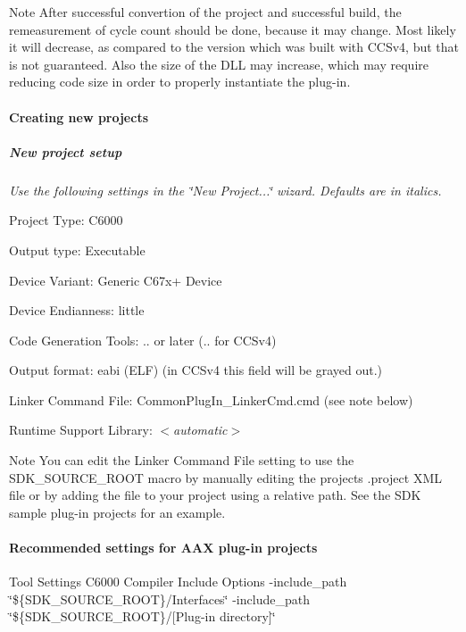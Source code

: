 \begin{DoxyNote}{Note}
After successful convertion of the project and successful build, the remeasurement of cycle count should be done, because it may change. Most likely it will decrease, as compared to the version which was built with C\+C\+Sv4, but that is not guaranteed. Also the size of the D\+LL may increase, which may require reducing code size in order to properly instantiate the plug-\/in.
\end{DoxyNote}
\hypertarget{a00832_subsubsection__creating_new_projects_}{}\paragraph{Creating new projects}\label{a00832_subsubsection__creating_new_projects_}
\subparagraph*{New project setup}

 {\itshape  Use the following settings in the \char`\"{}\+New Project...\char`\"{} wizard. Defaults are in italics.} 
\begin{DoxyItemize}
\item Project Type\+: {\ttfamily C6000}  
\item Output type\+: {\ttfamily Executable}  
\item Device Variant\+: {\ttfamily Generic C67x+ Device}  
\item Device Endianness\+: {\ttfamily little}  
\item Code Generation Tools\+: {..} or later ({..} for C\+C\+Sv4)  
\item Output format\+: eabi (E\+LF) (in C\+C\+Sv4 this field will be grayed out.) 
\item Linker Command File\+: {\ttfamily Common\+Plug\+In\+\_\+\+Linker\+Cmd.\+cmd} (see note below)  
\item Runtime Support Library\+: {\itshape  $<$automatic$>$}  
\end{DoxyItemize}

\begin{DoxyNote}{Note}
You can edit the Linker Command File setting to use the {\ttfamily S\+D\+K\+\_\+\+S\+O\+U\+R\+C\+E\+\_\+\+R\+O\+OT} macro by manually editing the project\textquotesingle{}s .project X\+ML file or by adding the file to your project using a relative path. See the S\+DK sample plug-\/in projects for an example.
\end{DoxyNote}
\hypertarget{a00832_subsubsection__recommended_settings_for_aax_plugin_projects_}{}\paragraph{Recommended settings for A\+A\+X plug-\/in projects}\label{a00832_subsubsection__recommended_settings_for_aax_plugin_projects_}
  Tool Settings   C6000 Compiler   Include Options   -\/{\ttfamily include\+\_\+path \char`\"{}\$\{\+S\+D\+K\+\_\+\+S\+O\+U\+R\+C\+E\+\_\+\+R\+O\+O\+T\}/\+Interfaces\char`\"{}}  -\/{\ttfamily include\+\_\+path \char`\"{}\$\{\+S\+D\+K\+\_\+\+S\+O\+U\+R\+C\+E\+\_\+\+R\+O\+O\+T\}/\mbox{[}\+Plug-\/in directory\mbox{]}\char`\"{}}

